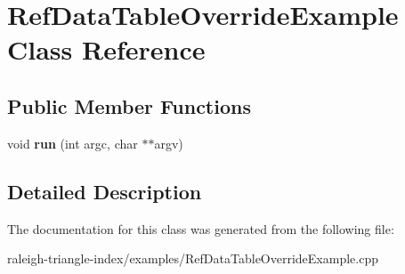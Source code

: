 \section{Ref\+Data\+Table\+Override\+Example Class Reference}
\label{class_ref_data_table_override_example}
\subsection*{Public Member Functions}
\begin{DoxyCompactItemize}
\item 
void {\bfseries run} (int argc, char $\ast$$\ast$argv)\label{class_ref_data_table_override_example_a428fbc1aed4d3b858acdf1210e9bb749}

\end{DoxyCompactItemize}


\subsection{Detailed Description}


The documentation for this class was generated from the following file\+:\begin{DoxyCompactItemize}
\item 
raleigh-\/triangle-\/index/examples/Ref\+Data\+Table\+Override\+Example.\+cpp\end{DoxyCompactItemize}

